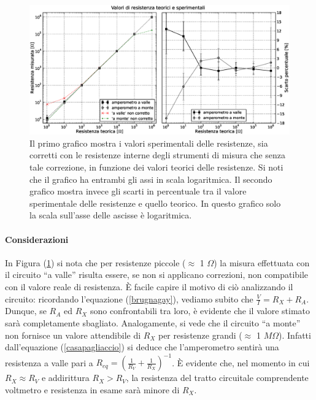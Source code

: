 \begin{figure}[h]
    \centering
        \includegraphics[width=\textwidth]{Res.eps}%
        \caption{Il primo grafico mostra i valori sperimentali delle resistenze, sia corretti con le resistenze interne degli strumenti di misura che senza tale correzione, in funzione dei valori teorici delle resistenze. Si noti che il grafico ha entrambi gli assi in scala logaritmica. Il secondo grafico mostra invece gli scarti in percentuale tra il valore sperimentale delle resistenze e quello teorico. In questo grafico solo la scala sull'asse delle ascisse è logaritmica.}
        \label{fig:resistenze}
\end{figure}

\paragraph{Considerazioni\\}
In Figura (\ref{fig:resistenze}) si nota che per resistenze piccole ($\approx$ 1 $\Omega$) la misura effettuata con il circuito ``a valle'' risulta essere, se non si applicano correzioni, non compatibile con il valore reale di resistenza. È facile capire il motivo di ciò analizzando il circuito: ricordando l'equazione (\ref{brugnagay}), vediamo subito che $\frac{V}{I}=R_X+R_A$. Dunque, se $R_A$ ed $R_X$ sono confrontabili tra loro, è evidente che il valore stimato sarà completamente sbagliato. Analogamente, si vede che il circuito ``a monte'' non fornisce un valore attendibile di $R_X$ per resistenze grandi ($\approx$ 1 $M\Omega$). Infatti dall'equazione (\ref{casapagliaccio}) si deduce che l'amperometro sentirà una resistenza a valle pari a $R_{eq}=(\frac{1}{R_V}+\frac{1}{R_X})^{-1}$. È evidente che, nel momento in cui $R_X \approx R_V$ e addirittura $R_X > R_V$, la resistenza del tratto circuitale comprendente voltmetro e resistenza in esame sarà minore di $R_X$.

